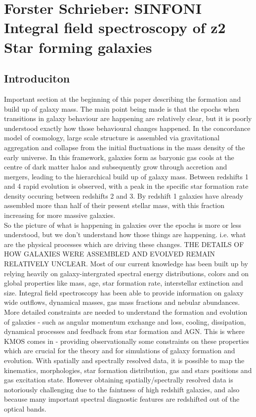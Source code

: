 \documentclass{literature}
\begin{document}
\section{Forster Schrieber: SINFONI Integral field spectroscopy of z2 Star forming galaxies}
\subsection{Introduciton}
Important section at the beginning of this paper describing the formation and build up of galaxy mass. The main point being made 
is that the epochs when transitions in galaxy behaviour are happening are relatively clear, but it is poorly 
understood exactly how those behavioural changes happened. In the concordance model of cosmology, large scale structure is assembled 
via gravitational aggregation and collapse from the initial fluctuations in the mass density of the early universe. In this framework, galaxies form as baryonic gas cools at the centre of dark matter halos and subsequently grow through accretion and mergers, leading to the hierarchical build up of galaxy mass. Between redshifts 1 and 4 rapid evolution is observed, with a peak in the specific star formation rate density occuring between redshifts 2 and 3. By redshift 1 galaxies have already assembled more than half of their present stellar mass, with this fraction increasing for more massive galaxies. \\ 
So the picture of what is happening in galaxies over the epochs is more or less understood, but we don't understand how those things are happening. i.e. what are the physical processes which are driving these changes. THE DETAILS OF HOW GALAXIES WERE ASSEMBLED AND EVOLVED REMAIN RELATIVELY UNCLEAR. Most of our current knowledge has been built up by relying heavily on galaxy-intergrated spectral energy distributions, colors and on global properties like mass, age, star formation rate, interstellar extinction and size. Integral field spectroscopy has been able to provide information on galaxy wide outflows, dynamical masses, gas mass fractions and nebular abundances. More detailed constraints are needed to understand the formation and evolution of galaxies - such as angular momentum exchange and loss, cooling, dissipation, dynamical processes and feedback from star formation and AGN. This is where KMOS comes in - providing observationally some constraints on these properties which are crucial for the theory and for simulations of galaxy formation and evolution. With spatially and spectrally resolved data, it is possible to map the kinematics, morphologies, star formation distribution, gas and stars positions and gas excitation state. However obtaining spatially/spectrally resolved data is notoriously challenging due to the faintness of high redshift galaxies, and also because many important spectral diagnostic features are redshifted out of the optical bands.  
\end{document}
